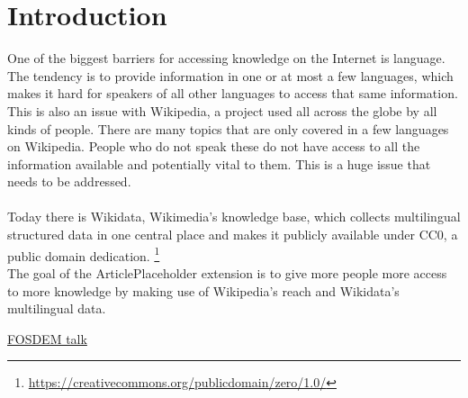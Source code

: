 \section{Introduction}
One of the biggest barriers for accessing knowledge on the Internet is language. The tendency is to provide information in one or at most a few languages, which makes it hard for speakers of all other languages to access that same information. This is also an issue with Wikipedia, a project used all across the globe by all kinds of people. There are many topics that are only covered in a few languages on Wikipedia. People who do not speak these do not have access to all the information available and potentially vital to them. This is a huge issue that needs to be addressed. \\
\\
Today there is Wikidata, Wikimedia’s knowledge base, which collects multilingual structured data in one central place and makes it publicly available under CC0, a public domain dedication. \footnote{\href{https://creativecommons.org/publicdomain/zero/1.0/}{https://creativecommons.org/publicdomain/zero/1.0/}} \\
The goal of the ArticlePlaceholder extension  is to give more people more access to more knowledge by making use of Wikipedia’s reach and Wikidata’s multilingual data.


\href{https://www.fosdem.org/2016/schedule/event/increasing_access_to_free_and_open_knowledge_for_speakers_of_underserved_languages_on_wikipedia/}{FOSDEM talk}